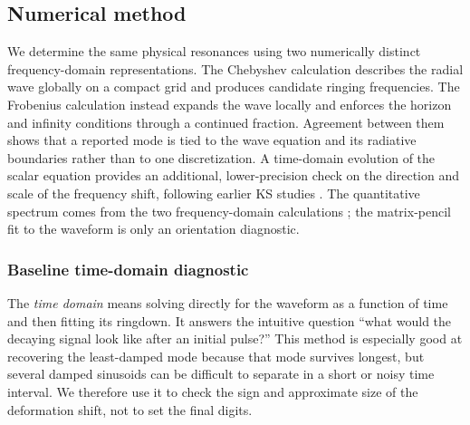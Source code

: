 \documentclass[12pt,a4paper]{article}
\begin{document}
\subsection{Numerical method}

We determine the same physical resonances using two numerically distinct
frequency-domain representations.  The Chebyshev calculation describes the radial wave globally
on a compact grid and produces candidate ringing frequencies.  The Frobenius
calculation instead expands the wave locally and enforces the horizon and
infinity conditions through a continued fraction.  Agreement between them
shows that a reported mode is tied to the wave equation and its radiative
boundaries rather than to one discretization.  A time-domain evolution of the
scalar equation provides an additional, lower-precision check on the direction
and scale of the frequency shift, following earlier KS studies
\cite{Konoplya2020}.  The quantitative spectrum comes from the two
frequency-domain calculations \cite{Leaver1985,Jansen2017}; the matrix-pencil
fit to the waveform is only an orientation diagnostic.

\subsubsection{Baseline time-domain diagnostic}

The \emph{time domain} means solving directly for the waveform as a function
of time and then fitting its ringdown.  It answers the intuitive question
``what would the decaying signal look like after an initial pulse?''  This
method is especially good at recovering the least-damped mode because that
mode survives longest, but several damped sinusoids can be difficult to
separate in a short or noisy time interval.  We therefore use it to check the
sign and approximate size of the deformation shift, not to set the final
digits.
\end{document}

